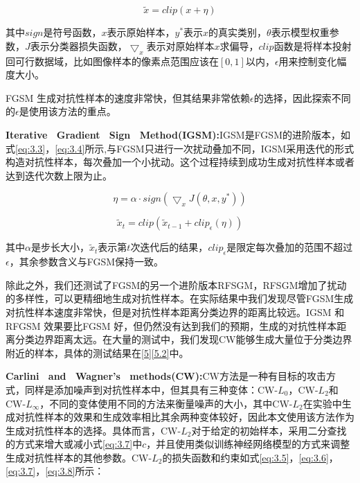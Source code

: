 \begin{equation}
	\label{eq:3.2}
	\tilde{x} = clip(x + \eta)
\end{equation}

\noindent 其中$sign$是符号函数，$x$表示原始样本，$y^*$表示$x$的真实类别，$\theta$表示模型权重参数，$J$表示分类器损失函数，$\bigtriangledown_x$表示对原始样本$x$求偏导，$clip$函数是将样本投射回可行数据域，比如图像样本的像素点范围应该在$[0,1]$以内，$\epsilon$用来控制变化幅度大小。

FGSM 生成对抗性样本的速度非常快，但其结果非常依赖$\epsilon$的选择，因此探索不同的$\epsilon$是使用该方法的重点。

\noindent\textbf{Iterative \ Gradient \ Sign \ Method(IGSM):}IGSM\cite{kurakin2018adversarial}是FGSM的进阶版本，如式\ref{eq:3.3}，\ref{eq:3.4}所示,与FGSM只进行一次扰动叠加不同，IGSM采用迭代的形式构造对抗性样本，每次叠加一个小扰动。这个过程持续到成功生成对抗性样本或者达到迭代次数上限为止。

\begin{equation}
	\label{eq:3.3}
	\eta = \alpha \cdot sign(\bigtriangledown_xJ(\theta,x,y^*))
\end{equation}

\begin{equation}
	\label{eq:3.4}
	\tilde{x}_t = clip(\tilde{x}_{t - 1}  + clip_{\epsilon}(\eta))
\end{equation}

\noindent 其中$\alpha$是步长大小，$\tilde{x}_t$表示第$t$次迭代后的结果，$clip_{\epsilon}$是限定每次叠加的范围不超过$\epsilon$，其余参数含义与FGSM保持一致。

除此之外，我们还测试了FGSM的另一个进阶版本RFSGM\cite{tramer2017ensemble}，RFSGM增加了扰动的多样性，可以更精细地生成对抗性样本。在实际结果中我们发现尽管FGSM生成对抗性样本速度非常快，但是对抗性样本距离分类边界的距离比较远。IGSM 和RFGSM 效果要比FGSM 好，但仍然没有达到我们的预期，生成的对抗性样本距离分类边界距离太远。在大量的测试中，我们发现CW能够生成大量位于分类边界附近的样本，具体的测试结果在\ref{5}\ref{5.2}中。

\noindent\textbf{Carlini \ and \ Wagner's \ methods(CW):}CW\cite{carlini2017towards}方法是一种有目标的攻击方式，同样是添加噪声到对抗性样本中，但其具有三种变体：CW-$L_0$，CW-$L_2$和CW-$L_{\infty}$，不同的变体使用不同的方法来衡量噪声的大小，其中CW-$L_2$在实验中生成对抗性样本的效果和生成效率相比其余两种变体较好，因此本文使用该方法作为生成对抗性样本的选择。具体而言，CW-$L_2$对于给定的初始样本，采用二分查找的方式来增大或减小式\ref{eq:3.7}中$c$，并且使用类似训练神经网络模型的方式来调整生成对抗性样本的其他参数。CW-$L_2$的损失函数和约束如式\ref{eq:3.5}，\ref{eq:3.6}，\ref{eq:3.7}，\ref{eq:3.8}所示：

